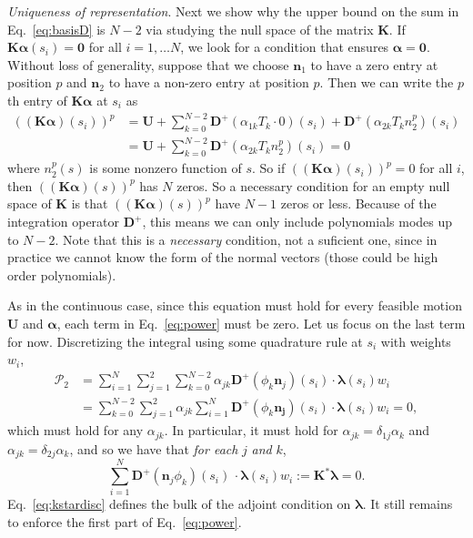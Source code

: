 \textit{Uniqueness of representation}. Next we show why the upper bound on the sum in Eq.\ \eqref{eq:basisD} is $N-2$ via studying the null space of the matrix $\bm{K}$. If $\bm{K}\bm{\alpha}(s_i)=\bm{0}$ for all $i = 1, \dots N$, we look for a condition that ensures $\bm{\alpha}=\bm{0}$. Without loss of generality, suppose that we choose $\bm{n}_1$ to have a zero entry at position $p$ and $\bm{n}_2$ to have a non-zero entry at position $p$. Then we can write the $p$th entry of $\bm{K}\bm{\alpha}$ at $s_i$ as 
\begin{align}
\left(\left(\bm{K}\bm{\alpha}\right)(s_i)\right)^p & = \bm{U} + \sum_{k=0}^{N-2} \bm{D}^+ \left(\alpha_{1k} T_k \cdot 0\right)(s_i) +  \bm{D}^+ \left(\alpha_{2k} T_k n_2^p\right)(s_i)\\[4 pt] & =\bm{U} + \sum_{k=0}^{N-2} \bm{D}^+ \left(\alpha_{2k} T_k n_2^p\right)(s_i) =0
\end{align}
where $n_2^p(s)$ is some nonzero function of $s$. So if $\left(\left(\bm{K}\bm{\alpha}\right)(s_i)\right)^p=0$ for all $i$, then $\left(\left(\bm{K}\bm{\alpha}\right)(s)\right)^p$ has $N$ zeros.  So a necessary condition for an empty null space of $\bm{K}$ is that $\left(\left(\bm{K}\bm{\alpha}\right)(s)\right)^p$ have $N-1$ zeros or less. Because of the integration operator $\bm{D}^+$, this means we can only include polynomials modes up to $N-2$. Note that this is a \textit{necessary} condition, not a suficient one, since in practice we cannot know the form of the normal vectors (those could be high order polynomials). 

\iffalse
As in the continuous case, since this equation must hold for every feasible motion $\bm{U}$ and $\bm{\alpha}$, each term in Eq.\ \eqref{eq:power} must be zero. Let us focus on the last term for now. Discretizing the integral using some quadrature rule at $s_i$ with weights $w_i$,
\begin{align}
    \mathcal{P}_2 &= \sum_{i=1}^{N} \sum_{j=1}^2\sum_{k=0}^{N-2} \alpha_{jk}\bm{D}^+\left(\phi_k \bm{n}_j\right)(s_i) \cdot \bm{\lambda}(s_i) w_i \\[4 pt]
& = \sum_{k=0}^{N-2} \sum_{j=1}^2 \alpha_{jk} \sum_{i=1}^{N} \bm{D}^+\left(\phi_k \bm{n_j}\right)(s_i) \cdot \bm{\lambda}(s_i) w_i=0, 
\end{align}
which must hold for any $\alpha_{jk}$. In particular, it must hold for $\alpha_{jk}=\delta_{1j} \alpha_k$ and $\alpha_{jk}=\delta_{2j} \alpha_k$, and so we have that \textit{for each} $j$ \textit{and} $k$, 
\begin{equation}
\label{eq:kstardisc}
    \sum_{i=1}^{N}\bm{D}^+\left(\bm{n}_j \phi_k\right)(s_i) \, \cdot \bm{\lambda}(s_i) w_i:=\bm{K}^*\bm{\lambda}=0.
\end{equation}
Eq.\ \eqref{eq:kstardisc} defines the bulk of the adjoint condition on $\bm{\lambda}$. It still remains to enforce the first part of Eq.\ \eqref{eq:power}. 

